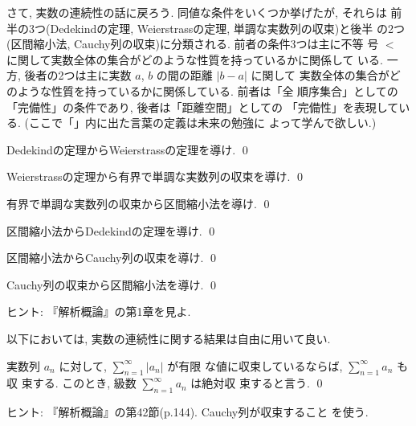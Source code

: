 \documentclass[12pt,twoside]{jarticle}
\begin{document}
さて, 実数の連続性の話に戻ろう. 同値な条件をいくつか挙げたが, それらは
前半の3つ(Dedekindの定理, Weierstrassの定理, 単調な実数列の収束)と後半
の2つ(区間縮小法, Cauchy列の収束)に分類される. 前者の条件3つは主に不等
号 $<$ に関して実数全体の集合がどのような性質を持っているかに関係して
いる. 一方, 後者の2つは主に実数 $a$, $b$ の間の距離 $|b - a|$ に関して
実数全体の集合がどのような性質を持っているかに関係している. 前者は「全
順序集合」としての「完備性」の条件であり, 後者は「距離空間」としての
「完備性」を表現している. (ここで「」内に出た言葉の定義は未来の勉強に
よって学んで欲しい.)

\begin{question}
  Dedekindの定理からWeierstrassの定理を導け.  \qed
\end{question}

\begin{question}
  Weierstrassの定理から有界で単調な実数列の収束を導け. \qed
\end{question}

\begin{question}\qstar{*}
  有界で単調な実数列の収束から区間縮小法を導け. \qed
\end{question}

\begin{question}\qstar{*}
  区間縮小法からDedekindの定理を導け. \qed
\end{question}

\begin{question}\qstar{*}
  区間縮小法からCauchy列の収束を導け. \qed
\end{question}

\begin{question}\qstar{*}
  Cauchy列の収束から区間縮小法を導け. \qed
\end{question}

\noindent ヒント: 『解析概論』の第1章を見よ.

以下においては, 実数の連続性に関する結果は自由に用いて良い.

\begin{question}
  実数列 $a_n$ に対して, $\displaystyle\sum_{n=1}^\infty|a_n|$ が有限
  な値に収束しているならば, $\displaystyle\sum_{n=1}^\infty a_n$ も収
  束する. このとき, 級数 $\displaystyle\sum_{n=1}^\infty a_n$ は絶対収
  束すると言う.  \qed
\end{question}

\noindent ヒント: 『解析概論』の第42節(p.144). Cauchy列が収束すること
を使う.

\end{document}
